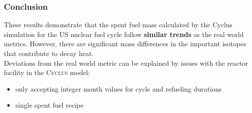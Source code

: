 \begin{frame}
  \frametitle{Conclusion}
        These results demonstrate that the spent fuel mass calculated by the Cyclus simulation for
        the US nuclear fuel cycle follow \textbf{similar trends} as the real
        world metrics.
        However, there are significant mass differences in the important isotopes that contribute to decay heat. 
        \\
        
        Deviations from the real world metric can be explained by issues with 
        the reactor facility in the \textsc{Cyclus} model: 
        \begin{itemize}
                \item only accepting integer month values for
                cycle and refueling durations
                \item single spent fuel recipe 
        \end{itemize}
        
\end{frame}
